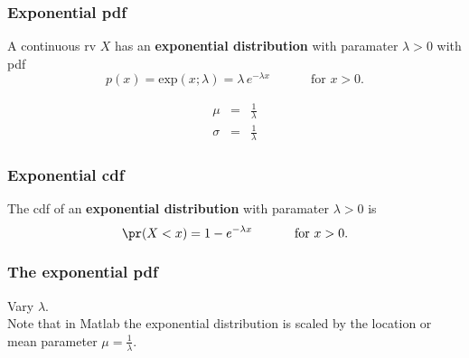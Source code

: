 \begin{frame}[fragile]\frametitle{Exponential pdf}

\begin{defn}
A continuous rv $X$ has an {\bf exponential distribution}
with paramater $\lambda > 0$ with pdf
$$p(x) = \mbox{exp}(x;\lambda) = \lambda \, e^{- \lambda x} \,\,
\,\,\,\,\,\,\,\,\,\,\,\, \,\,\ \mbox{ for } x > 0.$$   
\end{defn} 

\begin{eqnarray*}
\mu &=& \frac{1}{\lambda} \\
\sigma &=& \frac{1}{\lambda} 
\end{eqnarray*}

\end{frame}



\begin{frame}[fragile]\frametitle{Exponential cdf}

\begin{defn}
The cdf of an {\bf exponential distribution}
with paramater $\lambda > 0$ is
$$\pr(X<x) = 1- e^{-\lambda x}  \,\,
\,\,\,\,\,\,\,\,\,\,\,\, \,\,\ \mbox{ for } x > 0.$$ 
\end{defn}


\end{frame}


\begin{frame}[fragile]\frametitle{The exponential pdf}

Vary $\lambda$. \\ 
Note that in Matlab the exponential
distribution is scaled by the location
or mean parameter $\mu=\frac{1}{\lambda}$.

\end{frame}



